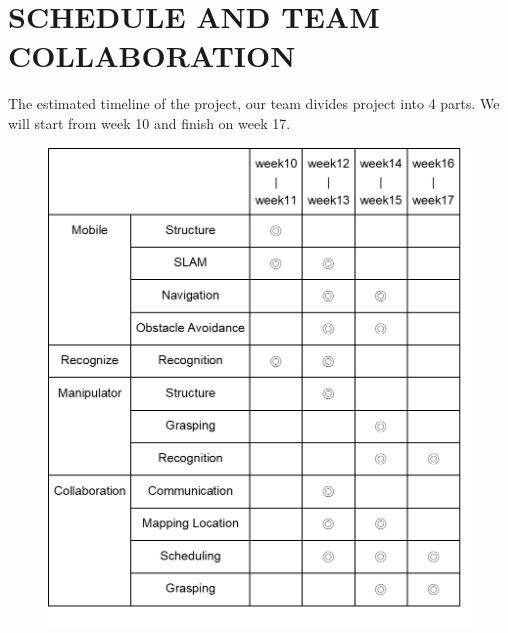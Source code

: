 \documentclass[a4paper, 10pt, conference]{ieeeconf}      %
\begin{document}
\section{SCHEDULE AND TEAM COLLABORATION}
The estimated timeline of the project, our team divides project into 4 parts. We will start from  week 10 and finish on week 17.
\begin{figure}[h]
\includegraphics[width=0.95\columnwidth]{schedule}
\centering
\end{figure}

\addtolength{\textheight}{-12cm}   %
\end{document}
